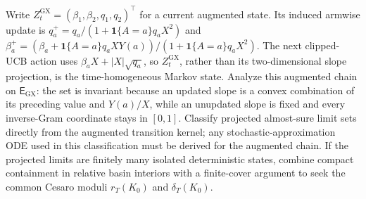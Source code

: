 Write \(Z^{\mathrm{GX}}_t=(\beta_1,\beta_2,q_1,q_2)^\top\) for a current augmented state. Its induced armwise update is \(q_a^+=q_a/(1+\mathbf 1\{A=a\}q_aX^2)\) and \(\beta_a^+=(\beta_a+\mathbf 1\{A=a\}q_aXY(a))/(1+\mathbf 1\{A=a\}q_aX^2)\). The next clipped-UCB action uses \(\beta_aX+|X|\sqrt{q_a}\), so \(Z^{\mathrm{GX}}_t\), rather than its two-dimensional slope projection, is the time-homogeneous Markov state. Analyze this augmented chain on \(\mathsf E_{\mathrm{GX}}\): the set is invariant because an updated slope is a convex combination of its preceding value and \(Y(a)/X\), while an unupdated slope is fixed and every inverse-Gram coordinate stays in \([0,1]\). Classify projected almost-sure limit sets directly from the augmented transition kernel; any stochastic-approximation ODE used in this classification must be derived for the augmented chain. If the projected limits are finitely many isolated deterministic states, combine compact containment in relative basin interiors with a finite-cover argument to seek the common Cesaro moduli \(r_T(K_0)\) and \(\delta_T(K_0)\).